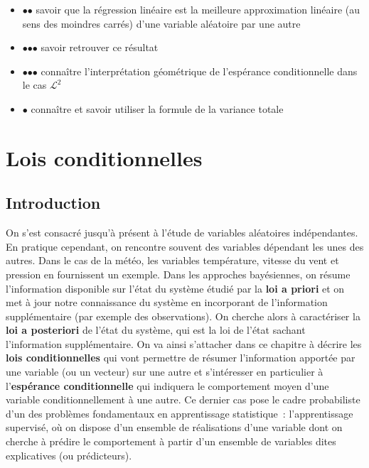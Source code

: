\label{III-cas-mathcall2}

\begin{itemize}
\tightlist
\item
  $\mathord{\bullet}\mathord{\bullet}$ savoir que la régression linéaire
  est la meilleure approximation linéaire (au sens des moindres carrés)
  d'une variable aléatoire par une autre
\item
  $\mathord{\bullet}\mathord{\bullet}\mathord{\bullet}$ savoir retrouver
  ce résultat
\item
  $\mathord{\bullet}\mathord{\bullet}\mathord{\bullet}$ connaître
  l'interprétation géométrique de l'espérance conditionnelle dans le cas
  \(\mathcal{L}^2\)
\item
  $\mathord{\bullet}$ connaître et savoir utiliser la formule de la
  variance totale
\end{itemize}

\chapter{Lois conditionnelles}\label{III-lois-conditionnelles-1}

\section{Introduction}\label{III-introduction}

On s'est consacré jusqu'à présent à l'étude de variables aléatoires
indépendantes. En pratique cependant, on rencontre souvent des variables
dépendant les unes des autres. Dans le cas de la météo, les variables
température, vitesse du vent et pression en fournissent un exemple. Dans
les approches bayésiennes, on résume l'information disponible sur l'état
du système étudié par la \textbf{loi a priori} et on met à jour notre
connaissance du système en incorporant de l'information supplémentaire
(par exemple des observations). On cherche alors à caractériser la
\textbf{loi a posteriori} de l'état du système, qui est la loi de l'état
sachant l'information supplémentaire. On va ainsi s'attacher dans ce
chapitre à décrire les \textbf{lois conditionnelles} qui vont permettre
de résumer l'information apportée par une variable (ou un vecteur) sur
une autre et s'intéresser en particulier à l'\textbf{espérance
conditionnelle} qui indiquera le comportement moyen d'une variable
conditionnellement à une autre. Ce dernier cas pose le cadre
probabiliste d'un des problèmes fondamentaux en apprentissage
statistique~: l'apprentissage supervisé, où on dispose d'un ensemble de
réalisations d'une variable dont on cherche à prédire le comportement à
partir d'un ensemble de variables dites explicatives (ou prédicteurs).

